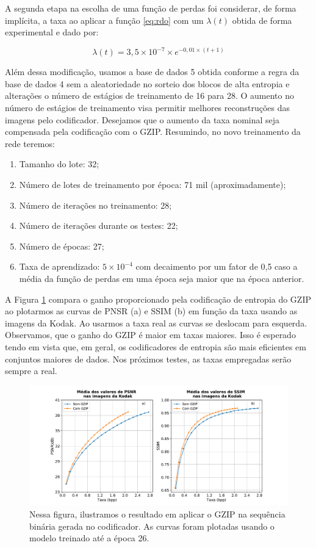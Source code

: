 A segunda etapa na escolha de uma função de perdas foi considerar, de forma implícita, a taxa ao aplicar a função \ref{eq:rdo} com um $\lambda(t)$ obtida de forma experimental e dado por: 

\begin{equation}
\lambda(t) = 3,5 \times 10^{-7} \times e^{-0,01 \times (t+1)}  
\end{equation}

Além dessa modificação, usamos a base de dados 5 obtida conforme a regra da base de dados 4 sem a aleatoriedade no sorteio dos blocos de alta entropia e alterações o número de estágios de treinamento de 16 para 28. O aumento no número de estágios de treinamento visa permitir melhores reconstruções das imagens pelo codificador. Desejamos que o aumento da taxa nominal seja compensada pela codificação com o GZIP.  Resumindo, no novo treinamento da rede teremos: 

\begin{enumerate}
	\label{enum:hiper_param2}
	\item Tamanho do lote: 32;  
	\item Número de lotes de treinamento por época: 71 mil (aproximadamente);   
	\item Número de iterações no treinamento: 28;
	\item Número de iterações durante os testes: 22;
	\item Número de épocas: 27;
	\item Taxa de aprendizado: $5 \times {10}^{-4}$ com decaimento por um fator de 0,5 caso a média da função de perdas em uma época seja maior que na época anterior.
\end{enumerate}
A Figura \ref{fig:gain_gzip_meida} compara o ganho proporcionado pela codificação de entropia do GZIP ao plotarmos as curvas de PNSR (a) e SSIM (b) em função da taxa usando as imagens da Kodak. Ao usarmos a taxa real as curvas se deslocam para esquerda. Observamos, que o ganho do GZIP é maior em taxas maiores. Isso é esperado tendo em vista que, em geral, os codificadores de entropia são mais eficientes em conjuntos maiores de dados. Nos próximos testes, as taxas empregadas serão sempre a real.    

\begin{figure}
	\centering
	\includegraphics[width=1.1\textwidth]{figuras/gain_gzip_media.pdf}
	\caption[Comparação de codificação com e sem o GZIP]{Nessa figura, ilustramos o resultado em aplicar o GZIP na sequência binária gerada no codificador. As curvas foram plotadas usando o modelo treinado até a época 26.}  	
	\label{fig:gain_gzip_meida}
\end{figure}

